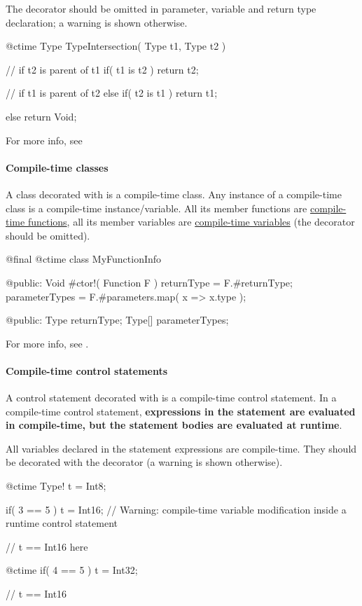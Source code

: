 The  decorator should be omitted in parameter, variable and return type declaration; a warning is shown otherwise.

\begin{code}
@ctime Type TypeIntersection( Type t1, Type t2 ) {
	// if t2 is parent of t1
	if( t1 is t2 )
		return t2;
		
	// if t1 is parent of t2
	else if( t2 is t1 )
		return t1;
	
	else
		return Void;
}
\end{code}

For more info, see 

\paragraph{Compile-time classes}
A class decorated with  is a compile-time class. Any instance of a compile-time class is a compile-time instance/variable. All its member functions are \hyperref[ctime:function]{compile-time functions}, all its member variables are \hyperref[ctime:variable]{compile-time variables} (the  decorator should be omitted).

\begin{code}
@final @ctime class MyFunctionInfo {

@public:
	Void #ctor!( Function F ) {
		returnType = F.#returnType;
		parameterTypes = F.#parameters.map( x => x.type );
	}
	
@public:
	Type returnType;
	Type[] parameterTypes;	
	
}
\end{code}

For more info, see .

\paragraph{Compile-time control statements}
A control statement decorated with  is a compile-time control statement. In a compile-time control statement, \textbf{expressions in the statement are evaluated in compile-time, but the statement bodies are evaluated at runtime}.

All variables declared in the statement expressions are compile-time. They should be decorated with the  decorator (a warning is shown otherwise).

\begin{code}
@ctime Type! t = Int8;

if( 3 == 5 )
	t = Int16; // Warning: compile-time variable modification inside a runtime control statement

// t == Int16 here

@ctime if( 4 == 5 )	
	t = Int32;
	
// t == Int16
\end{code}

